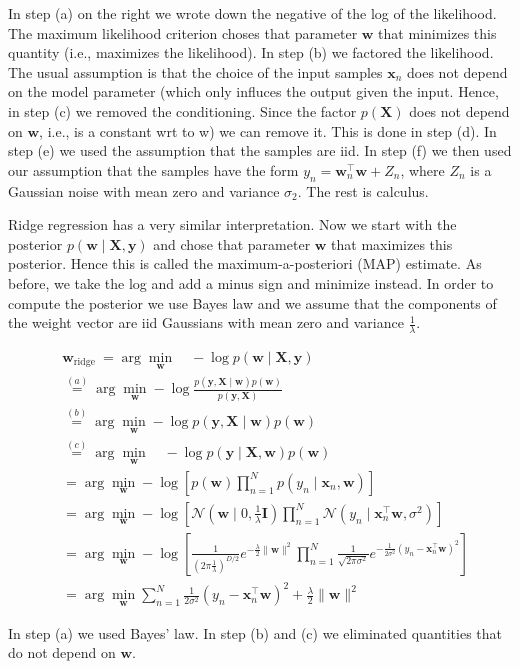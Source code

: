 In step (a) on the right we wrote down the negative of the log of the likelihood. The maximum likelihood criterion choses that parameter $\mathbf{w}$ that minimizes this quantity (i.e., maximizes the likelihood). In step (b) we factored the likelihood. The usual assumption is that the choice of the input samples $\mathbf{x}_{n}$ does not depend on the model parameter (which only influces the output given the input. Hence, in step (c) we removed the conditioning. Since the factor $p(\mathbf{X})$ does not depend on $\mathbf{w}$, i.e., is a constant wrt to w) we can remove it. This is done in step (d). In step (e) we used the assumption that the samples are iid. In step (f) we then used our assumption that the samples have the form $y_{n}=\mathbf{w}_{n}^{\top} \mathbf{w}+Z_{n}$,
where $Z_{n}$ is a Gaussian noise with mean zero and variance $\sigma_{2}$. The rest is calculus.

Ridge regression has a very similar interpretation. Now we start with the posterior $p(\mathbf{w} \mid \mathbf{X}, \mathbf{y})$ and chose that parameter $\mathbf{w}$ that maximizes this posterior. Hence this is called the maximum-a-posteriori (MAP) estimate. As before, we take the log and add a minus sign and minimize instead. In order to compute the posterior we use Bayes law and we assume that the components of the weight vector are iid Gaussians with mean zero and variance $\frac{1}{\lambda}$.

$$
\begin{aligned}
& \mathbf{w}_{\text {ridge }}=\arg \min _{\mathbf{w}} \quad-\log p(\mathbf{w} \mid \mathbf{X}, \mathbf{y}) \\
& \stackrel{(a)}{=} \arg \min _{\mathbf{w}}-\log \frac{p(\mathbf{y}, \mathbf{X} \mid \mathbf{w}) p(\mathbf{w})}{p(\mathbf{y}, \mathbf{X})} \\
& \stackrel{(b)}{=} \arg \min _{\mathbf{w}}-\log p(\mathbf{y}, \mathbf{X} \mid \mathbf{w}) p(\mathbf{w}) \\
& \stackrel{(c)}{=} \arg \min _{\mathbf{w}} \quad-\log p(\mathbf{y} \mid \mathbf{X}, \mathbf{w}) p(\mathbf{w}) \\
& =\arg \min _{\mathbf{w}}-\log \left[p(\mathbf{w}) \prod_{n=1}^{N} p\left(y_{n} \mid \mathbf{x}_{n}, \mathbf{w}\right)\right] \\
& =\arg \min _{\mathbf{w}}-\log \left[\mathcal{N}\left(\mathbf{w} \mid 0, \frac{1}{\lambda} \mathbf{I}\right) \prod_{n=1}^{N} \mathcal{N}\left(y_{n} \mid \mathbf{x}_{n}^{\top} \mathbf{w}, \sigma^{2}\right)\right] \\
& =\arg \min _{\mathbf{w}}-\log \left[\frac{1}{\left(2 \pi \frac{1}{\lambda}\right)^{D / 2}} e^{-\frac{\lambda}{2}\|\mathbf{w}\|^{2}} \prod_{n=1}^{N} \frac{1}{\sqrt{2 \pi \sigma^{2}}} e^{-\frac{1}{2 \sigma^{2}}\left(y_{n}-\mathbf{x}_{n}^{\top} \mathbf{w}\right)^{2}}\right] \\
& =\arg \min _{\mathbf{w}} \sum_{n=1}^{N} \frac{1}{2 \sigma^{2}}\left(y_{n}-\mathbf{x}_{n}^{\top} \mathbf{w}\right)^{2}+\frac{\lambda}{2}\|\mathbf{w}\|^{2}
\end{aligned}
$$

In step (a) we used Bayes' law. In step (b) and (c) we eliminated quantities that do not depend on $\mathbf{w}$.
